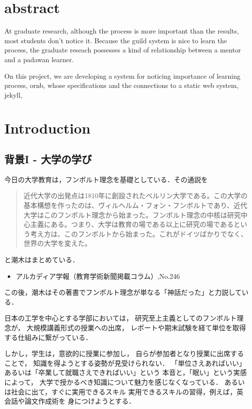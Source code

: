 \documentclass{jsarticle}
\author{\texttt{S}}
\date{}
\title{}
\begin{document}
\section{abstract}
\label{sec:orgb8f78bc}
At graduate research, 
although the process is more important than the results,
most students don't notice it.
Because the guild system is nice to learn the process,
the graduate reseach possesses a kind of
relationship between 
a mentor and a padawan learner.

On this project, 
we are developing a system for
noticing importance of learning process,
ornb, whose specifications and 
the connections to a static web system, jekyll,

\section{Introduction}
\label{sec:org26a9fca}
\subsection{背景I - 大学の学び}
\label{sec:org7fcd01e}
今日の大学教育は，フンボルト理念を基礎としている．その通説を
\begin{quote}
近代大学の出発点は1810年に創設されたベルリン大学である。この大学の基本構想を作ったのは、ヴィルヘルム・フォン・フンボルトであり、近代大学はこのフンボルト理念から始まった。フンボルト理念の中核は研究中心主義にある。つまり、大学は教育の場である以上に研究の場であるという考え方は、このフンボルトから始まった。これがドイツばかりでなく、世界の大学を変えた。
\end{quote}
と潮木はまとめている．
\begin{itemize}
\item アルカディア学報（教育学術新聞掲載コラム）,No.246
\end{itemize}
この後，潮木はその著書でフンボルト理念が単なる「神話だった」と力説している．

日本の工学を中心とする学部においては，
研究至上主義としてのフンボルト理念が，
大規模講義形式の授業への出席，
レポートや期末試験を経て単位を取得する仕組みに繋がっている．

しかし，学生は，意欲的に授業に参加し，
自らが参加者となり授業に出席することで，
知識を得ようとする姿勢が見受けられない．
「単位さえあればいい」あるいは「卒業して就職さえできればいい」という
本音と，「眠い」という実感によって，
大学で授かるべき知識について魅力を感じなくなっている．
あるいは社会に出て，すぐに実用できるスキル
実用できるスキルの習得，例えば，英会話や論文作成術を
身につけようとする．
\end{document}
